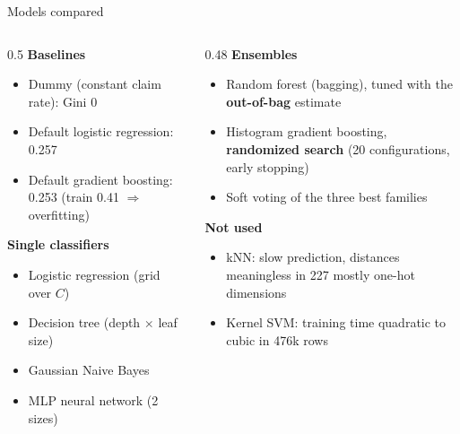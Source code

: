 \documentclass[aspectratio=169,11pt]{beamer}
\newcommand{\hl}[1]{\textcolor{accent}{\textbf{#1}}}
\begin{document}
\begin{frame}{Models compared}
  \begin{columns}[T]
    \begin{column}{0.5\textwidth}
      \textbf{Baselines}
      \begin{itemize}
        \item Dummy (constant claim rate): Gini 0
        \item Default logistic regression: 0.257
        \item Default gradient boosting: 0.253 (train 0.41 $\Rightarrow$ overfitting)
      \end{itemize}
      \medskip
      \textbf{Single classifiers}
      \begin{itemize}
        \item Logistic regression (grid over $C$)
        \item Decision tree (depth $\times$ leaf size)
        \item Gaussian Naive Bayes
        \item MLP neural network (2 sizes)
      \end{itemize}
    \end{column}
    \begin{column}{0.48\textwidth}
      \textbf{Ensembles}
      \begin{itemize}
        \item Random forest (bagging), tuned with the \hl{out-of-bag} estimate
        \item Histogram gradient boosting, \hl{randomized search} (20 configurations, early stopping)
        \item Soft voting of the three best families
      \end{itemize}
      \medskip
      \textbf{Not used}
      \begin{itemize}
        \item kNN: slow prediction, distances meaningless in 227 mostly one-hot dimensions
        \item Kernel SVM: training time quadratic to cubic in 476k rows
      \end{itemize}
    \end{column}
  \end{columns}
\end{frame}
\end{document}
